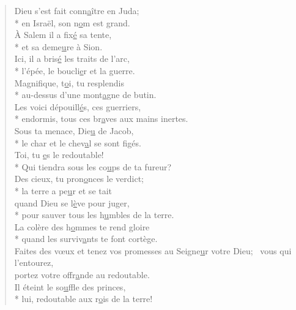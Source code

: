 
\begin{verse}
Dieu s’est fait conn\underline{a}ître en Juda; \\*
en Israël, son n\underline{o}m est grand. \\
À Salem il a fix\underline{é} sa tente, \\*
et sa deme\underline{u}re à Sion. \\
Ici, il a bris\underline{é} les traits de l’arc, \\*
l’épée, le boucli\underline{e}r et la guerre. \\

Magnifique, t\underline{o}i, tu resplendis \\*
au-dessus d’une mont\underline{a}gne de butin. \\
Les voici dépouill\underline{é}s, ces guerriers, \\*
endormis, tous ces br\underline{a}ves aux mains inertes. \\
Sous ta menace, Die\underline{u} de Jacob, \\*
le char et le chev\underline{a}l se sont figés. \\

Toi, tu \underline{e}s le redoutable! \\*
Qui tiendra sous les co\underline{u}ps de ta fureur? \\
Des cieux, tu pron\underline{o}nces le verdict; \\*
la terre a pe\underline{u}r et se tait \\
quand Dieu se l\underline{è}ve pour juger, \\*
pour sauver tous les h\underline{u}mbles de la terre. \\

La colère des h\underline{o}mmes te rend gloire \\*
quand les surviv\underline{a}nts te font cortège. \\
Faites des vœux et tenez vos promesses
au Seigne\underline{u}r votre Dieu;~\psalmstar
vous qui l’entourez, \\
portez votre offr\underline{a}nde au redoutable. \\
Il éteint le so\underline{u}ffle des princes, \\*
lui, redoutable aux r\underline{o}is de la terre! \\
\end{verse}

